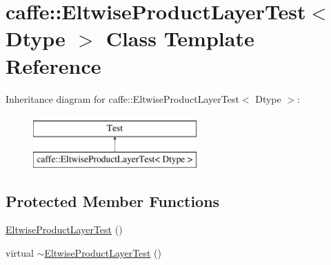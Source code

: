 \hypertarget{classcaffe_1_1_eltwise_product_layer_test}{\section{caffe\+:\+:Eltwise\+Product\+Layer\+Test$<$ Dtype $>$ Class Template Reference}
\label{classcaffe_1_1_eltwise_product_layer_test}
}
Inheritance diagram for caffe\+:\+:Eltwise\+Product\+Layer\+Test$<$ Dtype $>$\+:\begin{figure}[H]
\begin{center}
\leavevmode
\includegraphics[height=2.000000cm]{classcaffe_1_1_eltwise_product_layer_test}
\end{center}
\end{figure}
\subsection*{Protected Member Functions}
\begin{DoxyCompactItemize}
\item 
\hyperlink{classcaffe_1_1_eltwise_product_layer_test_ad706d4fd901f7a5269258a8ea43c6f43}{Eltwise\+Product\+Layer\+Test} ()
\item 
virtual \hyperlink{classcaffe_1_1_eltwise_product_layer_test_ae3221c2d98478e7ccef5f61d33d971df}{$\sim$\+Eltwise\+Product\+Layer\+Test} ()
\end{DoxyCompactItemize}
